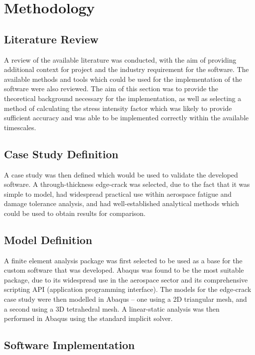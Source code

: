 \newpage
\section{Methodology}

\subsection{Literature Review}

A review of the available literature was conducted, with the aim of providing additional context for project and the industry requirement for the software. The available methods and tools which could be used for the implementation of the software were also reviewed. The aim of this section was to provide the theoretical background necessary for the implementation, as well as selecting a method of calculating the stress intensity factor which was likely to provide sufficient accuracy and was able to be implemented correctly within the available timescales.

\subsection{Case Study Definition}\label{sec:case_study}

A case study was then defined which would be used to validate the developed software. A through-thickness edge-crack was selected, due to the fact that it was simple to model, had widespread practical use within aerospace fatigue and damage tolerance analysis, and had well-established analytical methods which could be used to obtain results for comparison.

\subsection{Model Definition}

A finite element analysis package was first selected to be used as a base for the custom software that was developed. Abaqus was found to be the most suitable package, due to its widespread use in the aerospace sector and its comprehensive scripting API (application programming interface). The models for the edge-crack case study were then modelled in Abaqus -- one using a 2D triangular mesh, and a second using a 3D tetrahedral mesh. A linear-static analysis was then performed in Abaqus using the standard implicit solver.

\subsection{Software Implementation}


